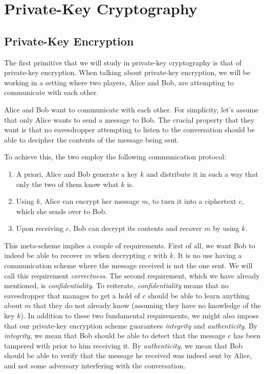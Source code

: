 
\chapter{Private-Key Cryptography}
\section{Private-Key Encryption}
The first primitive that we will study in private-key cryptography is that of private-key encryption.
When talking about private-key encryption, we will be working in a setting where two players, Alice and Bob, are attempting to communicate with each other.

Alice and Bob want to communicate with each other.
For simplicity, let's assume that only Alice wants to send a message to Bob.
The crucial property that they want is that no eavesdropper attempting to listen to the conversation should be able to decipher the contents of the message being sent.

To achieve this, the two employ the following communication protocol:
\begin{enumerate}
    \item A priori, Alice and Bob generate a key $k$ and distribute it in such a way that only the two of them know what $k$ is.
    \item Using $k$, Alice can encrypt her message $m$, to turn it into a ciphertext $c$, which she sends over to Bob. 
    \item Upon receiving $c$, Bob can decrypt its contents and recover $m$ by using $k$.
\end{enumerate}
This meta-scheme implies a couple of requirements.
First of all, we want Bob to indeed be able to recover $m$ when decrypting $c$ with $k$.
It is no use having a communication scheme where the message received is not the one sent. We will call this requirement \textit{correctness}.
The second requirement, which we have already mentioned, is \textit{confidentiality}.
To reiterate, \textit{confidentiality} means that no eavesdropper that manages to get a hold of $c$ should be able to learn anything about $m$ that they do not already know (assuming they have no knowledge of the key $k$).
In addition to these two fundamental requirements, we might also impose that our private-key encryption scheme guarantees \textit{integrity} and \textit{authenticity}.
By \textit{integrity}, we mean that Bob should be able to detect that the message $c$ has been tampered with prior to him receiving it.
By \textit{authenticity}, we mean that Bob should be able to verify that the message he received was indeed sent by Alice, and not some adversary interfering with the conversation.

